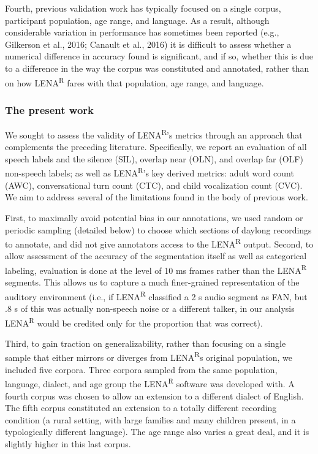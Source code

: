 \documentclass[english,table,man,floatsintext]{apa6}
\begin{document}
Fourth, previous validation work has typically focused on a single corpus, participant population, age range, and language. As a result, although considerable variation in performance has sometimes been reported (e.g., Gilkerson et al., 2016; Canault et al., 2016) it is difficult to assess whether a numerical difference in accuracy found is significant, and if so, whether this is due to a difference in the way the corpus was constituted and annotated, rather than on how LENA\textsuperscript{R} fares with that population, age range, and language.

\hypertarget{the-present-work}{%
\subsubsection{The present work}\label{the-present-work}}

We sought to assess the validity of LENA\textsuperscript{R}'s metrics through an approach that complements the preceding literature. Specifically, we report an evaluation of all speech labels and the silence (SIL), overlap near (OLN), and overlap far (OLF) non-speech labels; as well as LENA\textsuperscript{R}'s key derived metrics: adult word count (AWC), conversational turn count (CTC), and child vocalization count (CVC). We aim to address several of the limitations found in the body of previous work.

First, to maximally avoid potential bias in our annotations, we used random or periodic sampling (detailed below) to choose which sections of daylong recordings to annotate, and did not give annotators access to the LENA\textsuperscript{R} output. Second, to allow assessment of the accuracy of the segmentation itself as well as categorical labeling, evaluation is done at the level of 10 ms frames rather than the LENA\textsuperscript{R} segments. This allows us to capture a much finer-grained representation of the auditory environment (i.e., if LENA\textsuperscript{R} classified a 2 s audio segment as FAN, but .8 s of this was actually non-speech noise or a different talker, in our analysis LENA\textsuperscript{R} would be credited only for the proportion that was correct).

Third, to gain traction on generalizability, rather than focusing on a single sample that either mirrors or diverges from LENA\textsuperscript{R}s original population, we included five corpora. Three corpora sampled from the same population, language, dialect, and age group the LENA\textsuperscript{R} software was developed with. A fourth corpus was chosen to allow an extension to a different dialect of English. The fifth corpus constituted an extension to a totally different recording condition (a rural setting, with large families and many children present, in a typologically different language). The age range also varies a great deal, and it is slightly higher in this last corpus.
\end{document}
